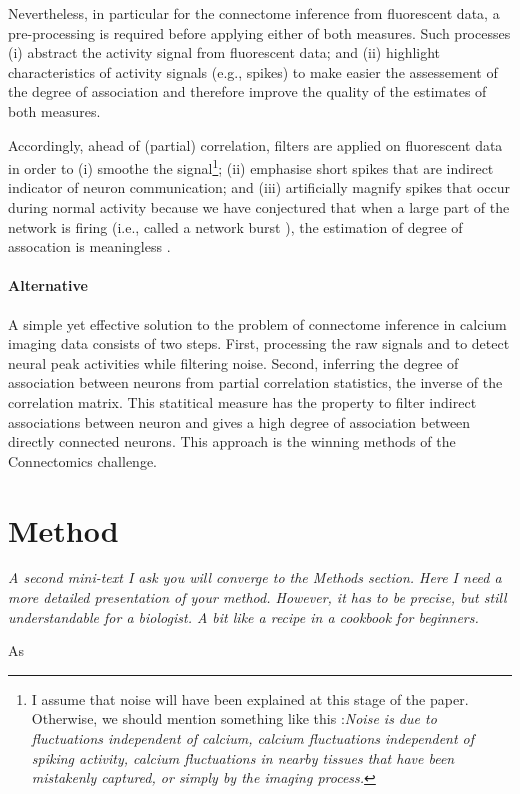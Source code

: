 \documentclass[wcp]{jmlr}
\begin{document}
Nevertheless, in particular for the connectome inference from fluorescent
data, a pre-processing is required before applying either of both measures.
Such processes (i) abstract the activity signal from fluorescent data; and
(ii) highlight characteristics of activity signals (e.g., spikes) to make
easier the assessement of the degree of association and therefore improve the
quality of the estimates of both measures.

Accordingly, ahead of (partial) correlation, filters are applied on
fluorescent data in order to (i) smoothe the signal\footnote{I assume that
noise will have been explained at this stage of the paper. Otherwise, we
should mention something like this :\textit{Noise is due to fluctuations
independent of calcium, calcium fluctuations independent of spiking activity,
calcium fluctuations in nearby tissues that have been mistakenly captured, or
simply by the imaging process.}}; (ii) emphasise short spikes that are
indirect indicator of neuron communication; and (iii) artificially magnify
spikes that occur during normal activity because we have conjectured that when
a large part of the network is firing (i.e., called a network burst
\citep{stetter2012model}), the estimation of degree of assocation is
meaningless \citep{sutera2014simple}.

\paragraph{Alternative}
A simple yet effective solution to the problem of connectome inference in
calcium imaging data consists of two steps. \cite{sutera2014simple} First,
processing the raw signals and to detect neural peak activities while filtering
noise. Second, inferring the degree of association between neurons from partial
correlation statistics, the inverse of the correlation matrix. This statitical
measure has the property to filter indirect associations between neuron and
gives a high degree of association between directly connected neurons. This
approach is the winning methods of the Connectomics challenge.

\section{Method}
\emph{A second mini-text I ask you will converge to the Methods section. Here I need
a more detailed presentation of your method. However, it has to be precise, but
still understandable for a biologist. A bit like a recipe in a cookbook for
beginners.}


As 



\newpage

\end{document}
